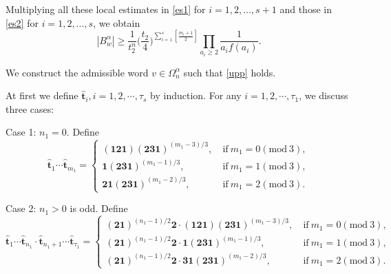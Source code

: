 \documentclass[reqno,11pt,graphicx,]{amsart}
\numberwithin{equation}{section}
\theoremstyle{plain}
\newcommand{\3}{\mathbf{3}}
\begin{document}
	Multiplying all these local estimates in \eqref{es1} for $i=1,2,...,s+1$ and those in \eqref{es2} for $i=1,2,...,s$, we obtain
	\begin{equation*}
		|B^\alpha_w|\ge\frac{1}{t_2^n}\Big(\frac{t_2}{4}\Big)^{\sum_{i=1}^{s}\left[\frac{m_i+1}{2}\right]}
		\prod_{a_i\ge2}\frac1{a_if(a_i)} .
	\end{equation*}
	
	 We construct the admissible word $v\in\Omega^{\alpha}_{n}$ such that \eqref{upp} holds. 
	
	At first we define $\hat{\mathbf{t}}_i,i =1,2,\cdots,\tau_s$ by induction. For any $i=1,2,\cdots,\tau_1$, we discuss three cases:
	
	{\rm Case 1:} $n_1=0$. Define
	\begin{equation*}
		\hat{\mathbf{t}}_1\cdots \hat{\mathbf{t}}_{m_1}=\begin{cases}
			(\mathbf{1}\mathbf{2}\mathbf{1})(\mathbf{2}\mathbf{3}\mathbf{1})^{(m_1-3)/3},\ &\text{if}\ m_1=0(\text{mod}\ 3),\\
			\mathbf{1}(\mathbf{2}\mathbf{3}\mathbf{1})^{(m_1-1)/3},\ &\text{if}\ m_1=1(\text{mod}\ 3),\\
			\mathbf{2}\mathbf{1}(\mathbf{2}\mathbf{3}\mathbf{1})^{(m_1-2)/3},\ &\text{if}\ m_1=2(\text{mod}\ 3).
		\end{cases}
	\end{equation*}
	
	{\rm Case 2:} $n_1>0$ is odd. Define
	\begin{equation*}
		\hat{\mathbf{t}}_1\cdots \hat{\mathbf{t}}_{n_1}\cdot\hat{\mathbf{t}}_{n_1+1}\cdots\hat{\mathbf{t}}_{\tau_1}=\begin{cases}
			(\mathbf{2}\mathbf{1})^{(n_1-1)/2}\mathbf{2}\cdot(\mathbf{1}\mathbf{2}\mathbf{1})(\mathbf{2}\mathbf{3}\mathbf{1})^{(m_1-3)/3},\ &\text{if}\ m_1=0(\text{mod}\ 3),\\
			(\mathbf{2}\mathbf{1})^{(n_1-1)/2}\mathbf{2}\cdot\mathbf{1}(\mathbf{2}\mathbf{3}\mathbf{1})^{(m_1-1)/3},\ &\text{if}\ m_1=1(\text{mod}\ 3),\\
			(\mathbf{2}\mathbf{1})^{(n_1-1)/2}\mathbf{2}\cdot\mathbf{3}\mathbf{1}(\mathbf{2}\mathbf{3}\mathbf{1})^{(m_1-2)/3},\ &\text{if}\ m_1=2(\text{mod}\ 3).
		\end{cases}
	\end{equation*}
	
\end{document}
